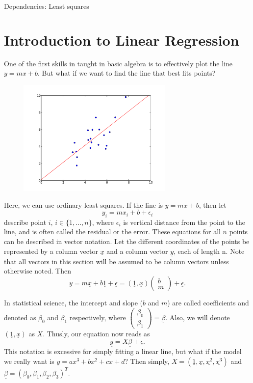 \label{Stats3?}

Dependencies: Least squares

\section*{Introduction to Linear Regression}

One of the first skills in taught in basic algebra is to effectively plot the line $y=mx+b$.  But what if we want to find the line that best fits points?

\begin{figure}[h]
\centering
\includegraphics[width=3in]{slr.pdf}
\end{figure}

Here, we can use ordinary least squares. If the line is $y=mx+b$, then let $$y_i = mx_i + b +\epsilon_i$$ describe point $i$, $i \in \{1,...,n\}$, where $\epsilon_i$ is vertical distance from the point to the line, and is often called the residual or the error. These equations for all $n$ points can be described in vector notation. Let the different coordinates of the points be represented by a column vector $\underline{x}$ and a column vector $\underline{y}$, each of length n. Note that all vectors in this section will be assumed to be column vectors unless otherwise noted. Then $$\underline{y}=m\underline{x}+b\underline{1}+\underline{\epsilon} = (\underline{1}, \underline{x}) \begin{pmatrix} b \\ m \end{pmatrix} + \underline{\epsilon}.$$ 

In statistical science, the intercept and slope ($b$ and $m$) are called coefficients and denoted as $\beta_0$ and $\beta_1$ respectively, where $\begin{pmatrix} \beta_0 \\ \beta_1 \end{pmatrix} = \underline{\beta}$. Also, we will denote $(\underline{1}, \underline{x})$ as $X$. Thusly, our equation now reads as $$\underline{y}=X\underline{\beta}+\underline{\epsilon}.$$ This notation is excessive for simply fitting a linear line, but what if the model we really want is $y=ax^3 + bx^2 + cx+d$? Then simply, $X=(\underline{1},\underline{x},\underline{x^2},\underline{x^3})$ and $\underline{\beta} = (\beta_0, \beta_1, \beta_2, \beta_3)^T$.


